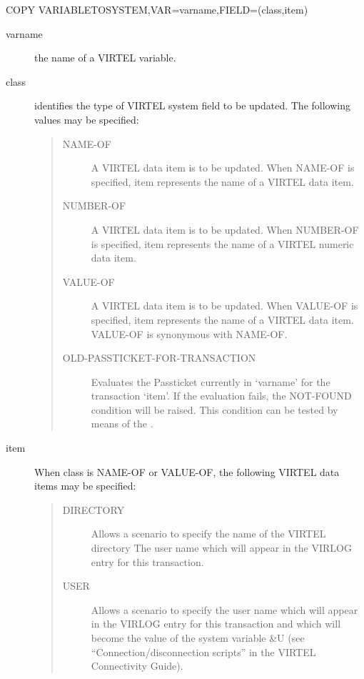 \documentclass[letterpaper,10pt,english]{sphinxmanual}
\begin{document}
\begin{sphinxVerbatim}[commandchars=\\\{\}]
COPY\PYGZdl{} VARIABLE\PYGZhy{}TO\PYGZhy{}SYSTEM,VAR=\PYGZsq{}varname\PYGZsq{},FIELD=(class,item)
\end{sphinxVerbatim}
\begin{description}
\item[{varname}] \leavevmode
the name of a VIRTEL variable.

\item[{class}] \leavevmode
identifies the type of VIRTEL system field to be updated. The following values may be specified:
\begin{quote}
\begin{description}
\item[{NAME-OF}] \leavevmode
A VIRTEL data item is to be updated. When NAME-OF is specified, item represents the name of a VIRTEL data item.

\item[{NUMBER-OF}] \leavevmode
A VIRTEL data item is to be updated. When NUMBER-OF is specified, item represents the name of a VIRTEL numeric data item.

\item[{VALUE-OF}] \leavevmode
A VIRTEL data item is to be updated. When VALUE-OF is specified, item represents the name of a VIRTEL data item. VALUE-OF is synonymous with NAME-OF.

\item[{OLD-PASSTICKET-FOR-TRANSACTION}] \leavevmode
Evaluates the Passticket currently in ‘varname’ for the transaction ‘item’. If the evaluation fails, the NOT-FOUND condition will be raised. This condition can be tested by means of the {\hyperref[\detokenize{User_Guide:v457ug-if}]{}}.

\end{description}
\end{quote}

\item[{item}] \leavevmode
When class is NAME-OF or VALUE-OF, the following VIRTEL data items may be specified:
\begin{quote}
\begin{description}
\item[{DIRECTORY}] \leavevmode
Allows a scenario to specify the name of the VIRTEL directory The user name which will appear in the VIRLOG entry for this transaction.

\item[{USER}] \leavevmode
Allows a scenario to specify the user name which will appear in the VIRLOG entry for this transaction and which will become the value of the system variable \&U (see “Connection/disconnection scripts” in the VIRTEL Connectivity Guide).


\end{description}
\end{quote}
\end{description}
\end{document}
